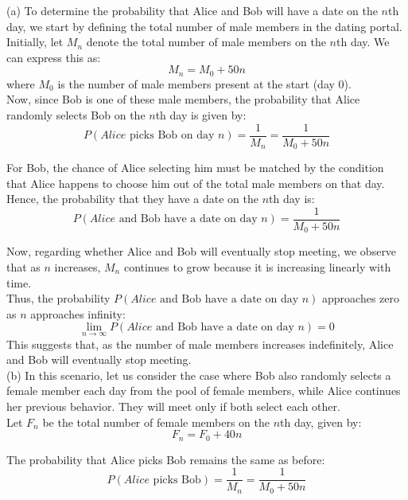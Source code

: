 \begin{solution}
    (a) To determine the probability that Alice and Bob will have a date on the \(n\)th day, we start by defining the total number of male members in the dating portal.\\
    
    Initially, let \(M_n\) denote the total number of male members on the \(n\)th day. We can express this as:
    \[
    M_n = M_0 + 50n
    \]
    where \(M_0\) is the number of male members present at the start (day 0).\\
    
    Now, since Bob is one of these male members, the probability that Alice randomly selects Bob on the \(n\)th day is given by:
    \[
    P(Alice \text{ picks Bob on day } n) = \frac{1}{M_n} = \frac{1}{M_0 + 50n}
    \]
    
    For Bob, the chance of Alice selecting him must be matched by the condition that Alice happens to choose him out of the total male members on that day. Hence, the probability that they have a date on the \(n\)th day is:
    \[
    P(Alice \text{ and Bob have a date on day } n) = \frac{1}{M_0 + 50n}
    \]
    
    Now, regarding whether Alice and Bob will eventually stop meeting, we observe that as \(n\) increases, \(M_n\) continues to grow because it is increasing linearly with time.\\
    
    Thus, the probability \(P(Alice \text{ and Bob have a date on day } n)\) approaches zero as \(n\) approaches infinity:
    \[
    \lim_{n \to \infty} P(Alice \text{ and Bob have a date on day } n) = 0
    \]
    This suggests that, as the number of male members increases indefinitely, Alice and Bob will eventually stop meeting.\\
    
    (b) In this scenario, let us consider the case where Bob also randomly selects a female member each day from the pool of female members, while Alice continues her previous behavior. They will meet only if both select each other.\\ 
    
    Let \(F_n\) be the total number of female members on the \(n\)th day, given by:
    \[
    F_n = F_0 + 40n
    \]
    
    The probability that Alice picks Bob remains the same as before:
    \[
    P(Alice \text{ picks Bob}) = \frac{1}{M_n} = \frac{1}{M_0 + 50n}
    \]
    

\end{solution}
